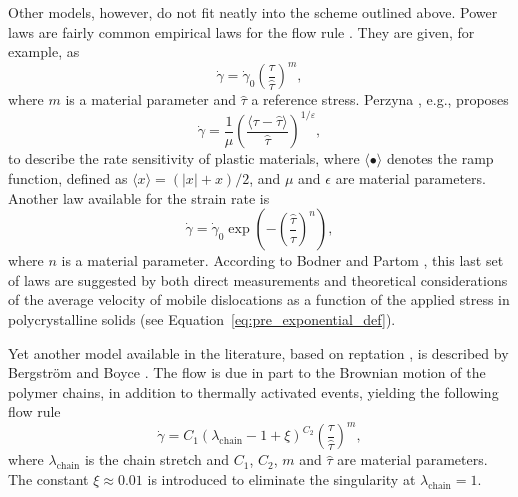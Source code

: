 Other models, however, do not fit neatly into the scheme outlined above.
Power laws are fairly common empirical laws for the flow rule \citep{brownPowerlawCreepEquation1980}.
They are given, for example, as \citep{bergstromMechanicsSolidPolymers2015}
\begin{equation}
	\label{eq:flow_rule_power_law}
	\dot \gamma = \dot \gamma_0 \left(\frac{\tau}{\hat \tau}\right)^m,
\end{equation}
where $m$ is a material parameter and $\hat \tau$ a reference stress.
Perzyna \citep{perzynaConstitutiveEquationsRate1963}, e.g., proposes
\begin{equation}
\label{eq:flow_rule_perzyna}
  \dot \gamma = \frac{1}{\mu}\left(\frac{\langle\tau - \hat\tau\rangle}{\hat\tau}\right)^{1/\varepsilon},
\end{equation}
to describe the rate sensitivity of plastic materials, where $\langle\bullet\rangle$ denotes the ramp function, defined as $\langle x\rangle = (|x| + x) /2$, and $\mu$ and $\epsilon$ are material parameters.
Another law available for the strain rate is \citep{kellyInfluenceLimitingDislocation1974, bodnerLargeDeformationElasticViscoplastic1972}
\begin{equation}
  \label{eq:exp_flow_law}
	\dot \gamma = \dot \gamma_0 \exp\left(-\left(\frac{\hat \tau}{\tau}\right)^n\right),
\end{equation}
where $n$ is a material parameter.
According to Bodner and Partom \citep{bodnerLargeDeformationElasticViscoplastic1972}, this last set of laws are suggested by both direct measurements and theoretical considerations of the average velocity of mobile dislocations as a function of the applied stress in polycrystalline solids (see Equation~\eqref{eq:pre_exponential_def}).

Yet another model available in the literature, based on reptation \citep{doiDynamicsConcentratedPolymer1978a}, is described by Bergström and Boyce \citep{bergstromConstitutiveModelingLarge1998, bergstromConstitutiveModelingTimedependent2001}.
The flow is due in part to the Brownian motion of the polymer chains, in addition to thermally activated events, yielding the following flow rule
\begin{equation}
	\label{eq:bb_reptation_model}
	\dot \gamma = C_1(\lambda_\text{chain} -1 + \xi)^{C_2}\left(\frac{\tau}{\hat\tau}\right)^{m},
\end{equation}
where $\lambda_\text{chain}$ is the chain stretch and $C_1$, $C_2$, $m$ and $\hat \tau$ are material parameters.
The constant $\xi\approx 0.01$ is introduced to eliminate the singularity at $\lambda_\text{chain}=1$.


